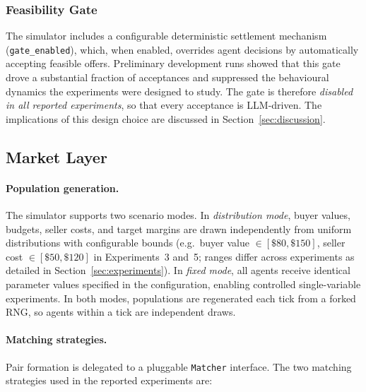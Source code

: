 \subsubsection{Feasibility Gate}
\label{sec:gate}

The simulator includes a configurable deterministic settlement mechanism (\texttt{gate\_\allowbreak enabled}), which, when enabled, overrides agent decisions by automatically accepting feasible offers.  Preliminary development runs showed that this gate drove a substantial fraction of acceptances and suppressed the behavioural dynamics the experiments were designed to study.  The gate is therefore \emph{disabled in all reported experiments}, so that every acceptance is LLM-driven.  The implications of this design choice are discussed in Section~\ref{sec:discussion}.

\subsection{Market Layer}
\label{sec:market}

\paragraph{Population generation.}
The simulator supports two scenario modes.  In \emph{distribution mode}, buyer values, budgets, seller costs, and target margins are drawn independently from uniform distributions with configurable bounds (e.g.\ buyer value $\in [\$80, \$150]$, seller cost $\in [\$50, \$120]$ in Experiments~3 and~5; ranges differ across experiments as detailed in Section~\ref{sec:experiments}).  In \emph{fixed mode}, all agents receive identical parameter values specified in the configuration, enabling controlled single-variable experiments.  In both modes, populations are regenerated each tick from a forked RNG, so agents within a tick are independent draws.

\paragraph{Matching strategies.}
\label{sec:matching}
Pair formation is delegated to a pluggable \texttt{Matcher} interface.  The two matching strategies used in the reported experiments are:

